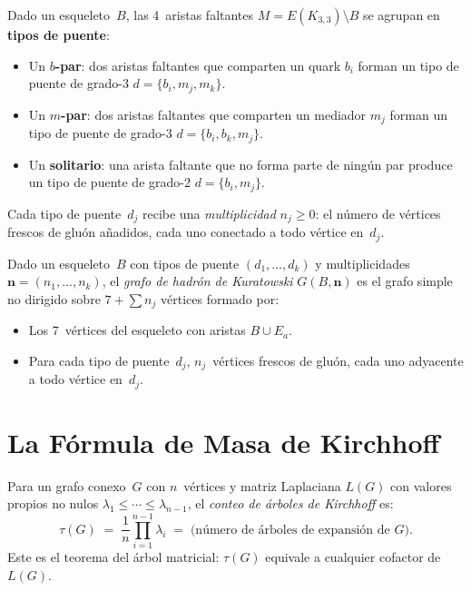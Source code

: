 \documentclass[11pt, a4paper, openany]{book}
\begin{document}
\begin{definition}
\label{def:bridge-types}
Dado un esqueleto~$B$, las 4~aristas faltantes
$M = E(K_{3,3}) \setminus B$ se agrupan en \textbf{tipos de puente}:
\begin{itemize}
  \item Un \textbf{$b$-par}: dos aristas faltantes que comparten un
    quark $b_i$ forman un tipo de puente de grado-3
    $d = \{b_i, m_j, m_k\}$.
  \item Un \textbf{$m$-par}: dos aristas faltantes que comparten un
    mediador $m_j$ forman un tipo de puente de grado-3
    $d = \{b_i, b_k, m_j\}$.
  \item Un \textbf{solitario}: una arista faltante que no forma parte
    de ning\'un par produce un tipo de puente de grado-2
    $d = \{b_i, m_j\}$.
\end{itemize}
Cada tipo de puente~$d_j$ recibe una \emph{multiplicidad}
$n_j \geq 0$: el n\'umero de v\'ertices frescos de glu\'on
a\~nadidos, cada uno conectado a todo v\'ertice en~$d_j$.
\end{definition}

\begin{definition}
\label{def:kuratowski-hadron}
Dado un esqueleto~$B$ con tipos de puente $(d_1, \ldots, d_k)$ y
multiplicidades $\mathbf{n} = (n_1, \ldots, n_k)$, el
\emph{grafo de hadr\'on de Kuratowski} $G(B, \mathbf{n})$ es el
grafo simple no dirigido sobre $7 + \sum n_j$ v\'ertices formado por:
\begin{itemize}
  \item Los 7~v\'ertices del esqueleto con aristas $B \cup E_a$.
  \item Para cada tipo de puente~$d_j$, $n_j$~v\'ertices frescos de
    glu\'on, cada uno adyacente a todo v\'ertice en~$d_j$.
\end{itemize}
\end{definition}

\section{La F\'ormula de Masa de Kirchhoff}
\label{sec:kirchhoff-mass}

\begin{definition}
\label{def:kirchhoff-tree-count}
Para un grafo conexo~$G$ con $n$~v\'ertices y matriz Laplaciana
$L(G)$ con valores propios no nulos
$\lambda_1 \leq \cdots \leq \lambda_{n-1}$, el
\emph{conteo de \'arboles de Kirchhoff} es:
\[
  \tau(G) \;=\; \frac{1}{n} \prod_{i=1}^{n-1} \lambda_i
  \;=\; \text{(n\'umero de \'arboles de expansi\'on de $G$)}.
\]
Este es el teorema del \'arbol matricial: $\tau(G)$ equivale a
cualquier cofactor de~$L(G)$.
\end{definition}
\end{document}
